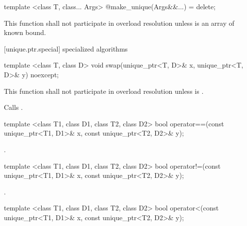 %
\begin{itemdecl}
template <class T, class... Args> @\unspec@ make_unique(Args&&...) = delete;
\end{itemdecl}

\begin{itemdescr}
\pnum
\remarks This function shall not participate in overload resolution unless  is an array of known bound.

\end{itemdescr}

[unique.ptr.special]{ specialized algorithms}

%
\begin{itemdecl}
template <class T, class D> void swap(unique_ptr<T, D>& x, unique_ptr<T, D>& y) noexcept;
\end{itemdecl}

\begin{itemdescr}
\pnum
\remarks This function shall not participate in overload resolution
unless  is .

\pnum
\effects Calls .
\end{itemdescr}

%
\begin{itemdecl}
template <class T1, class D1, class T2, class D2>
  bool operator==(const unique_ptr<T1, D1>& x, const unique_ptr<T2, D2>& y);
\end{itemdecl}

\begin{itemdescr}
\pnum
\returns {}.
\end{itemdescr}

%
\begin{itemdecl}
template <class T1, class D1, class T2, class D2>
  bool operator!=(const unique_ptr<T1, D1>& x, const unique_ptr<T2, D2>& y);
\end{itemdecl}

\begin{itemdescr}
\pnum
\returns {}.
\end{itemdescr}

%
\begin{itemdecl}
template <class T1, class D1, class T2, class D2>
  bool operator<(const unique_ptr<T1, D1>& x, const unique_ptr<T2, D2>& y);
\end{itemdecl}


